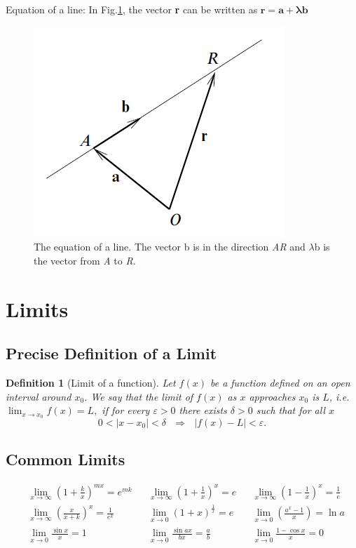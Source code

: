 \documentclass[12pt]{article}
\newtheorem{defn}{Definition}
\begin{document}
Equation of a line:
In Fig.\ref{eqnline}, the vector {\bfseries r} can be written as $\mathbf{r} = \mathbf{a + \lambda b}$
\begin{figure}[H]
	\centering
	\includegraphics[scale=0.75]{figures/line}
	\caption{\label{eqnline} The equation of a line. The vector b is in the direction \emph{AR} and $\mathcal{\lambda}$b is the vector from \emph{A} to \emph{R}.}
\end{figure}

\section{Limits}
\subsection{Precise Definition of a Limit}
\begin{defn}[Limit of a function]
	Let $f(x)$ be a function defined on an open interval around $x_0$. We say that the limit of $f(x)$ as $x$ approaches $x_0$ is $L$, i.e.
	$\lim _{ x \to x_{0} }{f(x) } = L,$	if for every $\varepsilon > 0 $ there exists $\delta >0$ such that for all $x$
	$$0 < \left| x - x_{0} \right |<\delta \textrm{ } \Rightarrow \textrm{ } \left |f(x) - L \right| < \varepsilon.$$
\end{defn}
\subsection{Common Limits}
\begin{align*}
&\lim_{x \to \infty}{\left(1 + \frac{k}{x}\right)}^{mx} = e^{mk} & &\lim_{x \to \infty}{\left(1 + \frac{1}{x}\right)}^{x} = e & &\lim_{x \to \infty}{\left(1 - \frac{1}{x}\right)}^{x} = \frac{1}{e}\\
&\lim_{x \to \infty}{\left(\frac{x}{x+k}\right)}^{x} = \frac{1}{e^k} & &\lim_{x \to 0}{\left(1 + x\right)}^{\frac{1}{x}} = e & &\lim_{x \to 0}{\left(\frac{a^x - 1}{x}\right)} = \ln a \\ 
&\lim_{x \to 0}{\frac{\sin x}{x}} = 1 & &\lim_{x \to 0}{\frac{\sin{ax}}{bx}} = \frac{a}{b} & &\lim_{x \to 0}{\frac{1 - \cos x}{x}} = 0 \\
\end{align*}
\end{document}
